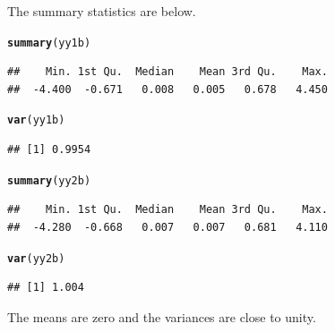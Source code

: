 \documentclass[12pt, a4paper, oneside]{article}\usepackage[]{graphicx}\usepackage[]{color}
\makeatletter
\newcommand{\hlkwd}[1]{\textcolor[rgb]{0.737,0.353,0.396}{\textbf{#1}}}%
\newenvironment{kframe}{%
 \def\at@end@of@kframe{}%
 \ifinner\ifhmode%
  \def\at@end@of@kframe{\end{minipage}}%
  \begin{minipage}{\columnwidth}%
 \fi\fi%
 \def\FrameCommand##1{\hskip\@totalleftmargin \hskip-\fboxsep
 \colorbox{shadecolor}{##1}\hskip-\fboxsep
     \hskip-\linewidth \hskip-\@totalleftmargin \hskip\columnwidth}%
 \MakeFramed {\advance\hsize-\width
   \@totalleftmargin\z@ \linewidth\hsize
   \@setminipage}}%
 {\par\unskip\endMakeFramed%
 \at@end@of@kframe}
\newenvironment{knitrout}{}{} %
\makeatother
\begin{document}
The summary statistics are below. 
\begin{knitrout}
\color{fgcolor}\begin{kframe}
\begin{alltt}
\hlkwd{summary}(yy1b)
\end{alltt}
\begin{verbatim}
##    Min. 1st Qu.  Median    Mean 3rd Qu.    Max. 
##  -4.400  -0.671   0.008   0.005   0.678   4.450
\end{verbatim}
\begin{alltt}
\hlkwd{var}(yy1b)
\end{alltt}
\begin{verbatim}
## [1] 0.9954
\end{verbatim}
\begin{alltt}
\hlkwd{summary}(yy2b)
\end{alltt}
\begin{verbatim}
##    Min. 1st Qu.  Median    Mean 3rd Qu.    Max. 
##  -4.280  -0.668   0.007   0.007   0.681   4.110
\end{verbatim}
\begin{alltt}
\hlkwd{var}(yy2b)
\end{alltt}
\begin{verbatim}
## [1] 1.004
\end{verbatim}
\end{kframe}
\end{knitrout}

The means are zero and the variances are close  to unity. 
\end{document}
